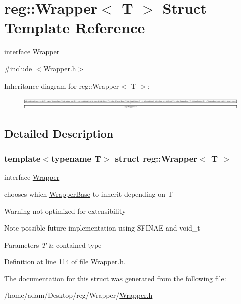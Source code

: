 \hypertarget{structreg_1_1_wrapper}{}\section{reg\+:\+:Wrapper$<$ T $>$ Struct Template Reference}
\label{structreg_1_1_wrapper}


interface \hyperlink{structreg_1_1_wrapper}{Wrapper}  




{\ttfamily \#include $<$Wrapper.\+h$>$}

Inheritance diagram for reg\+:\+:Wrapper$<$ T $>$\+:\begin{figure}[H]
\begin{center}
\leavevmode
\includegraphics[height=0.598930cm]{structreg_1_1_wrapper}
\end{center}
\end{figure}


\subsection{Detailed Description}
\subsubsection*{template$<$typename T$>$\newline
struct reg\+::\+Wrapper$<$ T $>$}

interface \hyperlink{structreg_1_1_wrapper}{Wrapper} 

chooses which \hyperlink{structreg_1_1_wrapper_base}{Wrapper\+Base} to inherit depending on {\ttfamily T} \begin{DoxyWarning}{Warning}
not optimized for extensibility 
\end{DoxyWarning}
\begin{DoxyNote}{Note}
possible future implementation using S\+F\+I\+N\+AE and void\+\_\+t 
\end{DoxyNote}

\begin{DoxyParams}{Parameters}
{\em T} & contained type \\
\hline
\end{DoxyParams}


Definition at line 114 of file Wrapper.\+h.



The documentation for this struct was generated from the following file\+:\begin{DoxyCompactItemize}
\item 
/home/adam/\+Desktop/reg/\+Wrapper/\hyperlink{_wrapper_8h}{Wrapper.\+h}\end{DoxyCompactItemize}
